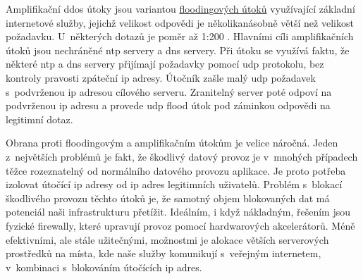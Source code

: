 
\noindent
Amplifikační \acrshort{ddos} útoky jsou variantou \hyperref[subsec:ddos-flood-attack]{floodingových útoků} využívající základní internetové služby, jejichž velikost odpovědi je několikanásobně větší než velikost požadavku. U~některých dotazů je poměr až 1:200 \cite{ddos-amplify-ratio}. Hlavními cíli amplifikačních útoků jsou nechráněné \acrshort{ntp} servery\cite{ddos-amplify-ratio} a \acrshort{dns} servery\cite{dns-flood}. Při útoku se využívá faktu, že některé \acrshort{ntp} a \acrshort{dns} servery přijímají požadavky pomocí \acrshort{udp} protokolu, bez kontroly pravosti zpáteční \acrshort{ip} adresy. Útočník zašle malý \acrshort{udp} požadavek s~podvrženou \acrshort{ip} adresou cílového serveru. Zranitelný server poté odpoví na podvrženou \acrshort{ip} adresu a provede \acrshort{udp} flood útok pod záminkou odpovědi na legitimní dotaz.


\noindent
Obrana proti floodingovým a amplifikačním útokům je velice náročná. Jeden z~největších problémů je fakt, že škodlivý datový provoz je v~mnohých případech těžce rozeznatelný od normálního datového provozu aplikace. Je proto potřeba izolovat útočící \acrshort{ip} adresy od \acrshort{ip} adres legitimních uživatelů. Problém s~blokací škodlivého provozu těchto útoků je, že samotný objem blokovaných dat má potenciál naši infrastrukturu přetížit. Ideálním, i když nákladným, řešením jsou fyzické firewally, které upravují provoz pomocí hardwarových akcelerátorů. Méně efektivními, ale stále užitečnými, možnostmi je alokace větších serverových prostředků na místa, kde naše služby komunikují s~veřejným internetem, v~kombinaci s~blokováním útočících \acrshort{ip} adres. 
